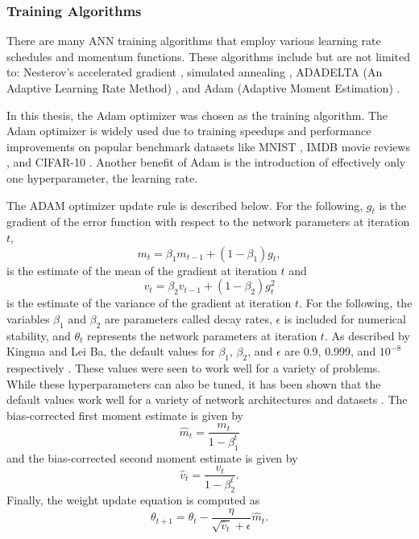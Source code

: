 \subsubsection{Training Algorithms} \label{section_training_algs}

There are many ANN training algorithms that employ various learning rate schedules and momentum functions. These algorithms include but are not limited to: Nesterov's accelerated gradient \cite{nesterov1983}, simulated annealing \cite{Kirkpatrick1983}, ADADELTA (An Adaptive Learning Rate Method) \cite{ADADELTA}, and Adam (Adaptive Moment Estimation) \cite{Kingma2015}. 

In this thesis, the Adam optimizer was chosen as the training algorithm. The Adam optimizer is widely used due to training speedups and performance improvements on popular benchmark datasets like MNIST \cite{lecun98}, IMDB movie reviews \cite{Maas2011}, and CIFAR-10 \cite{Krizhevsky2009}. Another benefit of Adam is the introduction of effectively only one hyperparameter, the learning rate.

The ADAM optimizer update rule is described below. For the following, $g_t$ is the gradient of the error function with respect to the network parameters at iteration $t$, 
\begin{equation} \label{eq:adam1}
m_t = \beta_1 m_{t-1} + (1 - \beta_1) g_t,
\end{equation}
is the estimate of the mean of the gradient at iteration $t$ and
\begin{equation} \label{eq:adam2}
v_t = \beta_2 v_{t-1} + (1 - \beta_2) g_t^2
\end{equation}
is the estimate of the variance of the gradient at iteration $t$. For the following, the variables $\beta_1$ and $\beta_2$ are parameters called decay rates, $\epsilon$ is included for numerical stability, and $\theta_t$ represents the network parameters at iteration $t$. As described by Kingma and Lei Ba, the default values for $\beta_1$, $\beta_2$, and $\epsilon$ are 0.9, 0.999, and $10^{-8}$ respectively \cite{Kingma2015}. These values were seen to work well for a variety of problems. While these hyperparameters can also be tuned, it has been shown that the default values work well for a variety of network architectures and datasets \cite{Kingma2015}. The bias-corrected first moment estimate is given by
\begin{equation} \label{eq:adam3}
\hat{m}_t = \dfrac{m_t}{1 - \beta^t_1}
\end{equation}
and the bias-corrected second moment estimate is given by 
\begin{equation} \label{eq:adam4}
\hat{v}_t = \dfrac{v_t}{1 - \beta^t_2}.
\end{equation}
Finally, the weight update equation is computed as
\begin{equation} \label{eq:adam5}
\theta_{t+1} = \theta_{t} - \dfrac{\eta}{\sqrt{\hat{v}_t} + \epsilon} \hat{m}_t.
\end{equation}


